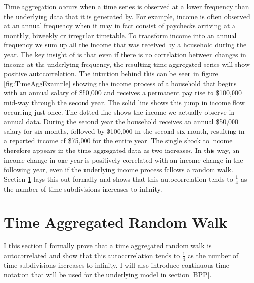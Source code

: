 \documentclass[AER]{AEA}
\begin{document}
Time aggregation occurs when a time series is observed at a lower frequency than the underlying data that it is generated by. For example, income is often observed at an annual frequency when it may in fact consist of paychecks arriving at a monthly, biweekly or irregular timetable. To transform income into an annual frequency we sum up all the income that was received by a household during the year. The key insight of \cite{working_note_1960} is that even if there is no correlation between changes in income at the underlying frequency, the resulting time aggregated series will show positive autocorrelation. The intuition behind this can be seen in figure \ref{fig:TimeAggExample} showing the income process of a household that begins with an annual salary of \$50,000 and receives a permanent pay rise to \$100,000 mid-way through the second year. The solid line shows this jump in income flow occurring just once. The dotted line shows the income we actually observe in annual data. During the second year the household receives an annual \$50,000 salary for six months, followed by \$100,000 in the second six month, resulting in a reported income of \$75,000 for the entire year. The single shock to income therefore appears in the time aggregated data as two increases. In this way, an income change in one year is positively correlated with an income change in the following year, even if the underlying income process follows a random walk. Section \ref{TimeAggRandomWalk} lays this out formally and shows that this autocorrelation tends to $\frac{1}{4}$ as the number of time subdivisions increases to infinity.

\section{Time Aggregated Random Walk} \label{TimeAggRandomWalk}
I this section I formally prove that a time aggregated random walk is autocorrelated and show that this autocorrelation tends to $\frac{1}{4}$ as the number of time subdivisions increases to infinity. I will also introduce continuous time notation that will be used for the underlying model in section \ref{BPP}.
\end{document}
